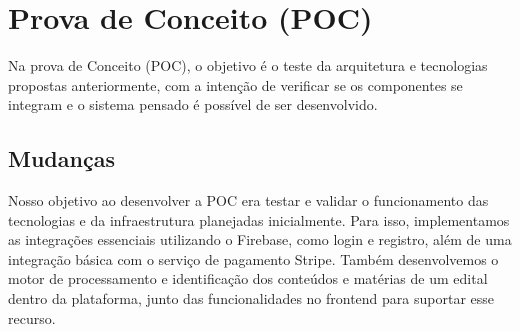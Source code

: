 \section{Prova de Conceito (POC)}

Na prova de Conceito (POC), o objetivo é o teste da arquitetura e tecnologias propostas anteriormente, com a intenção de verificar se os componentes se integram e o sistema pensado é possível de ser desenvolvido.

\subsection{Mudanças}

    Nosso objetivo ao desenvolver a POC era testar e validar o funcionamento das tecnologias e da infraestrutura planejadas inicialmente. Para isso, implementamos as integrações essenciais utilizando o Firebase, como login e registro, além de uma integração básica com o serviço de pagamento Stripe. Também desenvolvemos o motor de processamento e identificação dos conteúdos e matérias de um edital dentro da plataforma, junto das funcionalidades no frontend para suportar esse recurso.


	

 

